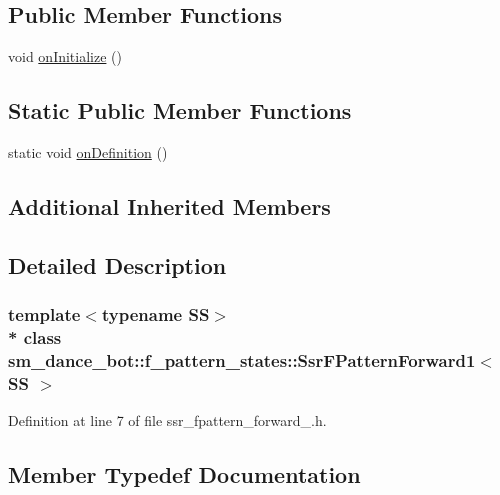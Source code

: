 \subsection*{Public Member Functions}
\begin{DoxyCompactItemize}
\item 
void \hyperlink{structsm__dance__bot_1_1f__pattern__states_1_1SsrFPatternForward1_aae67acf89beb4e94205c36d26ca22f90}{on\+Initialize} ()
\end{DoxyCompactItemize}
\subsection*{Static Public Member Functions}
\begin{DoxyCompactItemize}
\item 
static void \hyperlink{structsm__dance__bot_1_1f__pattern__states_1_1SsrFPatternForward1_a6af59cf44d933ef5c3067b2e81c5e904}{on\+Definition} ()
\end{DoxyCompactItemize}
\subsection*{Additional Inherited Members}


\subsection{Detailed Description}
\subsubsection*{template$<$typename SS$>$\\*
class sm\+\_\+dance\+\_\+bot\+::f\+\_\+pattern\+\_\+states\+::\+Ssr\+F\+Pattern\+Forward1$<$ S\+S $>$}



Definition at line 7 of file ssr\+\_\+fpattern\+\_\+forward\+\_.\+h.



\subsection{Member Typedef Documentation}
